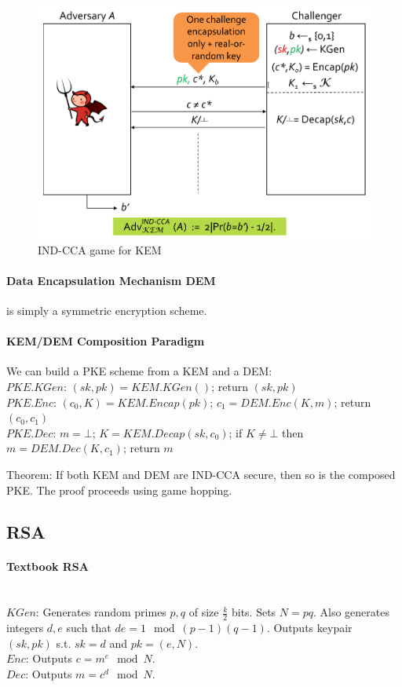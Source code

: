 \begin{figure}[h]
    \centering
	\includegraphics[scale=0.4]{images/kem-ind-cca.png}
    \caption{IND-CCA game for KEM}
    \label{fig:kem-ind-cca}
\end{figure}

\paragraph{Data Encapsulation Mechanism DEM}
is simply a symmetric encryption scheme.

\paragraph{KEM/DEM Composition Paradigm}
We can build a PKE scheme from a KEM and a DEM:
\\
$PKE.KGen$:
$(sk, pk) = KEM.KGen()$; return $(sk, pk)$
\\
$PKE.Enc$:
$(c_0, K) = KEM.Encap(pk)$; $c_1 = DEM.Enc(K, m)$; return $(c_0, c_1)$
\\
$PKE.Dec$:
$m = \bot$; $K = KEM.Decap(sk, c_0)$; if $K \neq \bot$ then $m = DEM.Dec(K, c_1)$; return $m$

Theorem: If both KEM and DEM are IND-CCA secure, then so is the composed PKE.
The proof proceeds using game hopping.


\subsection{RSA}

\paragraph{Textbook RSA}\mbox{}\\
$KGen$:
Generates random primes $p, q$ of size $\frac{k}{2}$ bits.
Sets $N=pq$.
Also generates integers $d, e$ such that $de = 1 \mod (p-1)(q-1)$.
Outputs keypair $(sk, pk)$ s.t. $sk = d$ and $pk = (e, N)$.
\\
$Enc$:
Outputs $c = m^e \mod N$.
\\
$Dec$:
Outputs $m = c^d \mod N$.

